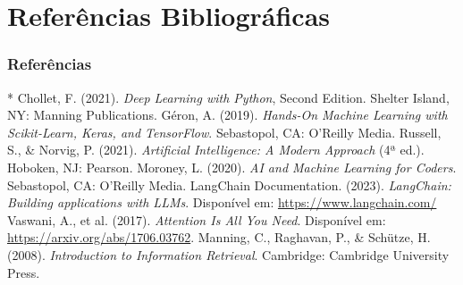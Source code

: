 \documentclass{beamer}
\begin{document}
\section{Referências Bibliográficas}
\begin{frame}[t,allowframebreaks]
\frametitle{Referências}
%
%
\begin{thebibliography}{*}
     Chollet, F. (2021). \textit{Deep Learning with Python}, Second Edition. Shelter Island, NY: Manning Publications.
     Géron, A. (2019). \textit{Hands-On Machine Learning with Scikit-Learn, Keras, and TensorFlow}. Sebastopol, CA: O'Reilly Media.
     Russell, S., \& Norvig, P. (2021). \textit{Artificial Intelligence: A Modern Approach} (4ª ed.). Hoboken, NJ: Pearson.
     Moroney, L. (2020). \textit{AI and Machine Learning for Coders}. Sebastopol, CA: O'Reilly Media.
     LangChain Documentation. (2023). \textit{LangChain: Building applications with LLMs}. Disponível em: \url{https://www.langchain.com/}
     Vaswani, A., et al. (2017). \textit{Attention Is All You Need}. Disponível em: \url{https://arxiv.org/abs/1706.03762}.
     Manning, C., Raghavan, P., \& Schütze, H. (2008). \textit{Introduction to Information Retrieval}. Cambridge: Cambridge University Press.
\end{thebibliography}
\end{frame}
\section{}


\begin{frame}
\titlepage
\end{frame}
\end{document}
